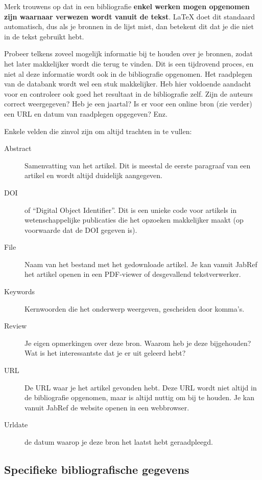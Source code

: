 Merk trouwens op dat in een bibliografie \textbf{enkel werken mogen opgenomen zijn waarnaar verwezen wordt vanuit de tekst}. {\LaTeX} doet dit standaard automatisch, dus als je bronnen in de lijst mist, dan betekent dit dat je die niet in de tekst gebruikt hebt.

Probeer telkens zoveel mogelijk informatie bij te houden over je bronnen, zodat het later makkelijker wordt die terug te vinden. Dit is een tijdrovend proces, en niet al deze informatie wordt ook in de bibliografie opgenomen. Het raadplegen van de databank wordt wel een stuk makkelijker. Heb hier voldoende aandacht voor en controleer ook goed het resultaat in de bibliografie zelf. Zijn de auteurs correct weergegeven? Heb je een jaartal? Is er voor een online bron (zie verder) een URL en datum van raadplegen opgegeven? Enz.

Enkele velden die zinvol zijn om altijd trachten in te vullen:

\begin{description}
  \item[Abstract] Samenvatting van het artikel. Dit is meestal de eerste paragraaf van een artikel en wordt altijd duidelijk aangegeven.
  \item[DOI] of ``Digital Object Identifier''. Dit is een unieke code voor artikels in wetenschappelijke publicaties die het opzoeken makkelijker maakt (op voorwaarde dat de DOI gegeven is).
  \item[File] Naam van het bestand met het gedownloade artikel. Je kan vanuit JabRef het artikel openen in een PDF-viewer of desgevallend tekstverwerker.
  \item[Keywords] Kernwoorden die het onderwerp weergeven, gescheiden door komma's.
  \item[Review] Je eigen opmerkingen over deze bron. Waarom heb je deze bijgehouden? Wat is het interessantste dat je er uit geleerd hebt?
  \item[URL] De URL waar je het artikel gevonden hebt. Deze URL wordt niet altijd in de bibliografie opgenomen, maar is altijd nuttig om bij te houden. Je kan vanuit JabRef de website openen in een webbrowser.
  \item[Urldate] de datum waarop je deze bron het laatst hebt geraadpleegd.
\end{description}

\subsection{Specifieke bibliografische gegevens}
\label{sub:specifieke_bibliografische_gegevens}

